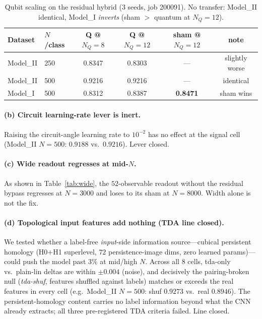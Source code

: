 \documentclass[10pt,letterpaper]{article}
\theoremstyle{plain}
\theoremstyle{definition}
\newcommand{\win}[1]{\textcolor{good}{\textbf{#1}}}
\newcommand{\lose}[1]{\textcolor{bad}{#1}}
\begin{document}
\begin{table}[h!]
\centering
\caption{Qubit scaling on the residual hybrid ($3$ seeds, job 200091). No
transfer: Model\_II identical, Model\_I \emph{inverts} (sham $>$ quantum at
$N_Q{=}12$).}
\label{tab:qubit-neg}
\begin{tabular}{@{}llcccc@{}}
\toprule
Dataset & $N$/class & Q @ $N_Q{=}8$ & Q @ $N_Q{=}12$ & sham @ $N_Q{=}12$ & note \\
\midrule
Model\_II & 250 & 0.8347 & 0.8303 & --- & slightly worse \\
Model\_II & 500 & 0.9216 & 0.9216 & --- & identical \\
Model\_I  & 500 & 0.8312 & \lose{0.8387} & \win{0.8471} & sham wins \\
\bottomrule
\end{tabular}
\end{table}

\paragraph{(b) Circuit learning-rate lever is inert.}
Raising the circuit-angle learning rate to $10^{-2}$ has no effect at the signal
cell (Model\_II $N{=}500$: $0.9188$ vs.\ $0.9216$). Lever closed.

\paragraph{(c) Wide readout regresses at mid-$N$.}
As shown in Table~\ref{tab:wide}, the $52$-observable readout without the residual
bypass regresses at $N{=}3000$ and loses to its sham at $N{=}8000$. Width alone is
not the fix.

\paragraph{(d) Topological input features add nothing (TDA line closed).}
We tested whether a label-free \emph{input}-side information source---cubical
persistent homology (H0$+$H1 superlevel, $72$ persistence-image dims, zero learned
params)---could push the model past $3\%$ at mid/high $N$. Across all $8$ cells,
tda-only vs.\ plain-lin deltas are within $\pm0.004$ (noise), and decisively the
pairing-broken null (\emph{tda-shuf}, features shuffled against labels) matches or
exceeds the real features in every cell (e.g.\ Model\_II $N{=}500$: shuf $0.9273$
vs.\ real $0.8946$). The persistent-homology content carries no label information
beyond what the CNN already extracts; all three pre-registered TDA criteria
failed. Line closed.
\end{document}

